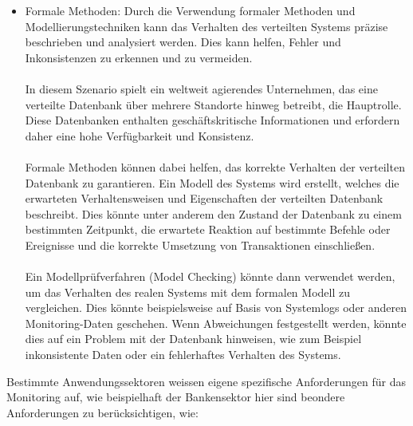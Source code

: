 \begin{itemize}
\item Formale Methoden: Durch die Verwendung formaler Methoden und Modellierungstechniken kann das Verhalten des verteilten Systems präzise beschrieben und analysiert werden. Dies kann helfen, Fehler und Inkonsistenzen zu erkennen und zu vermeiden.
\\\\
In diesem Szenario spielt ein weltweit agierendes Unternehmen, das eine verteilte Datenbank über mehrere Standorte hinweg betreibt, die Hauptrolle. Diese Datenbanken enthalten geschäftskritische Informationen und erfordern daher eine hohe Verfügbarkeit und Konsistenz.
\\\\
Formale Methoden können dabei helfen, das korrekte Verhalten der verteilten Datenbank zu garantieren. Ein Modell des Systems wird erstellt, welches die erwarteten Verhaltensweisen und Eigenschaften der verteilten Datenbank beschreibt. Dies könnte unter anderem den Zustand der Datenbank zu einem bestimmten Zeitpunkt, die erwartete Reaktion auf bestimmte Befehle oder Ereignisse und die korrekte Umsetzung von Transaktionen einschließen.
\\\\
Ein Modellprüfverfahren (Model Checking) könnte dann verwendet werden, um das Verhalten des realen Systems mit dem formalen Modell zu vergleichen. Dies könnte beispielsweise auf Basis von Systemlogs oder anderen Monitoring-Daten geschehen. Wenn Abweichungen festgestellt werden, könnte dies auf ein Problem mit der Datenbank hinweisen, wie zum Beispiel inkonsistente Daten oder ein fehlerhaftes Verhalten des Systems.
\end{itemize}
Bestimmte Anwendungssektoren weissen eigene spezifische Anforderungen für das Monitoring auf, wie beispielhaft der Bankensektor hier sind beondere Anforderungen zu berücksichtigen, wie: 

